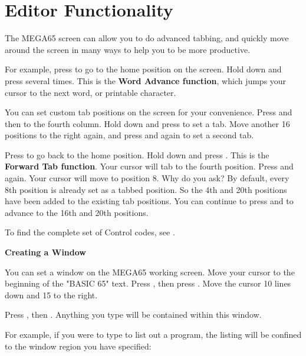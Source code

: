 \section{Editor Functionality}


The MEGA65 screen can allow you to do advanced tabbing, and quickly move around the screen in many ways to help you to be more productive.

For example, press  to go to the home position on the screen. Hold  down and press  several times. This is the \textbf{Word Advance function}, which jumps your cursor to the next word, or printable character.

You can set custom tab positions on the screen for your convenience. Press  and then \megakey{$\rightarrow$} to the fourth column. Hold down  and press  to set a tab. Move another 16 positions to the right again, and press  and  again to set a second tab.

Press  to go back to the home position. Hold  down and press . This is the \textbf{Forward Tab function}. Your cursor will tab to the fourth position. Press  and  again. Your cursor will move to position 8. Why do you ask? By default, every 8th position is already set as a tabbed position. So the 4th and 20th positions have been added to the existing tab positions. You can continue to press  and  to advance to the 16th and 20th positions.

To find the complete set of Control codes, see .

\textbf{Creating a Window}

You can set a window on the MEGA65 working screen. Move your cursor to the beginning of the "BASIC 65" text. Press , then press . Move the cursor 10 lines down and 15 to the right.

Press , then . Anything you type will be contained within this window.

For example, if you were to type  to list out a program, the listing will be confined to the window region you have specified:

